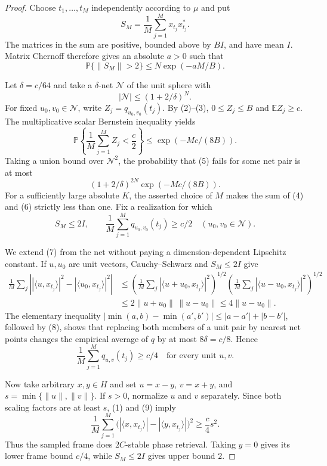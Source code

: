 \documentclass[11pt]{article}
\newcommand{\E}{\mathbb E}
\newcommand{\PP}{\mathbb P}
\newcommand{\ip}[2]{\langle #1,#2\rangle}
\begin{document}
\begin{proof}
Choose $t_1,\ldots,t_M$ independently according to $\mu$ and put
\[
 S_M=\frac1M\sum_{j=1}^M x_{t_j}x_{t_j}^*.
\]
The matrices in the sum are positive, bounded above by $BI$, and have
mean $I$.  Matrix Chernoff therefore gives an absolute $a>0$ such that
\[
 \PP\{\|S_M\|>2\}\le N\exp(-aM/B).                             \tag{4}
\]

Let $\delta=c/64$ and take a $\delta$-net $\mathcal N$ of the unit sphere
with
\[
 |\mathcal N|\le(1+2/\delta)^N.
\]
For fixed $u_0,v_0\in\mathcal N$, write
$Z_j=q_{u_0,v_0}(t_j)$.  By (2)--(3), $0\le Z_j\le B$ and
$\E Z_j\ge c$.  The multiplicative scalar Bernstein inequality yields
\[
 \PP\left\{\frac1M\sum_{j=1}^M Z_j<\frac c2\right\}
 \le \exp(-Mc/(8B)).                                           \tag{5}
\]
Taking a union bound over $\mathcal N^2$, the probability that (5) fails
for some net pair is at most
\[
 (1+2/\delta)^{2N}\exp(-Mc/(8B)).                              \tag{6}
\]
For a sufficiently large absolute $K$, the asserted choice of $M$ makes
the sum of (4) and (6) strictly less than one.  Fix a realization for
which
\[
 S_M\le2I,\qquad
 \frac1M\sum_{j=1}^Mq_{u_0,v_0}(t_j)\ge c/2
 \quad(u_0,v_0\in\mathcal N).                                 \tag{7}
\]

We extend (7) from the net without paying a dimension-dependent
Lipschitz constant.  If $u,u_0$ are unit vectors, Cauchy--Schwarz and
$S_M\le2I$ give
\begin{align*}
 \frac1M\sum_j\left|
 |\ip{u}{x_{t_j}}|^2-|\ip{u_0}{x_{t_j}}|^2\right|
 &\le
 \left(\frac1M\sum_j|\ip{u+u_0}{x_{t_j}}|^2\right)^{1/2}
 \left(\frac1M\sum_j|\ip{u-u_0}{x_{t_j}}|^2\right)^{1/2}\\
 &\le2\|u+u_0\|\,\|u-u_0\|
 \le4\|u-u_0\|.                                                \tag{8}
\end{align*}
The elementary inequality
$|\min(a,b)-\min(a',b')|\le |a-a'|+|b-b'|$, followed by (8), shows that
replacing both members of a unit pair by nearest net points changes the
empirical average of $q$ by at most $8\delta=c/8$.  Hence
\[
 \frac1M\sum_{j=1}^Mq_{u,v}(t_j)\ge c/4
 \quad\text{for every unit }u,v.                              \tag{9}
\]

Now take arbitrary $x,y\in H$ and set $u=x-y$, $v=x+y$, and
$s=\min\{\|u\|,\|v\|\}$.  If $s>0$, normalize $u$ and $v$ separately.
Since both scaling factors are at least $s$, (1) and (9) imply
\[
 \frac1M\sum_{j=1}^M
 \bigl(|\ip{x}{x_{t_j}}|-|\ip{y}{x_{t_j}}|\bigr)^2
 \ge\frac{c}{4}s^2.
\]
Thus the sampled frame does $2C$-stable phase retrieval.  Taking $y=0$
gives its lower frame bound $c/4$, while $S_M\le2I$ gives upper bound $2$.
\end{proof}
\end{document}
